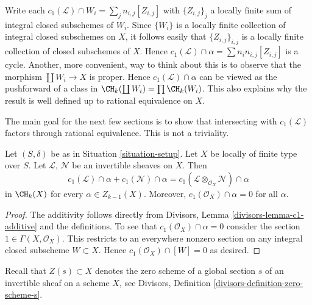 \noindent
Write each $c_1(\mathcal{L}) \cap W_i = \sum_j n_{i, j} [Z_{i, j}]$
with $\{Z_{i, j}\}_j$ a locally finite sum
of integral closed subschemes of $W_i$. Since $\{W_i\}$ is a locally
finite collection of integral closed subschemes on $X$, it follows
easily that $\{Z_{i, j}\}_{i, j}$ is a locally finite collection
of closed subschemes of $X$. Hence
$c_1(\mathcal{L}) \cap \alpha = \sum n_in_{i, j}[Z_{i, j}]$
is a cycle. Another, more convenient, way to think about this
is to observe that the morphism $\coprod W_i \to X$ is
proper. Hence $c_1(\mathcal{L}) \cap \alpha$ can be viewed
as the pushforward of a class in $\CH_k(\coprod W_i) = \prod \CH_k(W_i)$.
This also explains why the result is well defined up to rational
equivalence on $X$.

\medskip\noindent
The main goal for the next few sections is to show that intersecting with
$c_1(\mathcal{L})$ factors through rational equivalence.
This is not a triviality.

\begin{lemma}
\label{lemma-c1-cap-additive}
Let $(S, \delta)$ be as in Situation \ref{situation-setup}.
Let $X$ be locally of finite type over $S$.
Let $\mathcal{L}$, $\mathcal{N}$ be an invertible sheaves on $X$.
Then
$$
c_1(\mathcal{L}) \cap \alpha  + c_1(\mathcal{N}) \cap \alpha =
c_1(\mathcal{L} \otimes_{\mathcal{O}_X} \mathcal{N}) \cap \alpha
$$
in $\CH_k(X)$ for every $\alpha \in Z_{k - 1}(X)$. Moreover,
$c_1(\mathcal{O}_X) \cap \alpha = 0$ for all $\alpha$.
\end{lemma}

\begin{proof}
The additivity follows directly from
Divisors, Lemma \ref{divisors-lemma-c1-additive}
and the definitions. To see that $c_1(\mathcal{O}_X) \cap \alpha = 0$
consider the section $1 \in \Gamma(X, \mathcal{O}_X)$. This restricts
to an everywhere nonzero section on any integral closed subscheme
$W \subset X$. Hence $c_1(\mathcal{O}_X) \cap [W] = 0$ as desired.
\end{proof}

\noindent
Recall that $Z(s) \subset X$ denotes the zero scheme of a global section
$s$ of an invertible sheaf on a scheme $X$, see
Divisors, Definition \ref{divisors-definition-zero-scheme-s}.

